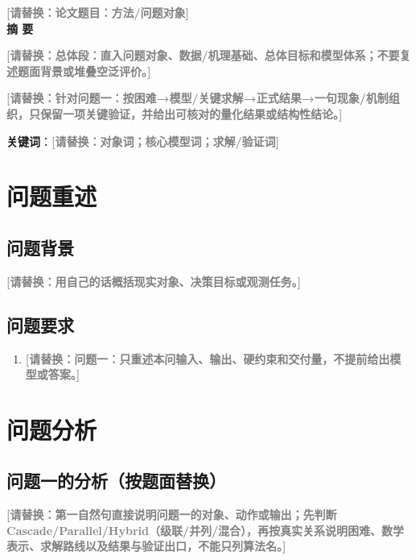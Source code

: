 \documentclass[12pt,a4paper]{ctexart}
\newcommand{\placeholder}[1]{\textcolor{gray}{\textbf{[请替换：#1]}}}
\begin{document}
\begin{center}
    {\heiti \textbf{\placeholder{论文题目：方法/问题对象}}}\\[1.5em]
    {\large \textbf{摘 \quad 要}}\\[1em]
\end{center}

\placeholder{总体段：直入问题对象、数据/机理基础、总体目标和模型体系；不要复述题面背景或堆叠空泛评价。}\par

\placeholder{针对问题一：按困难→模型/关键求解→正式结果→一句现象/机制组织，只保留一项关键验证，并给出可核对的量化结果或结构性结论。}\par

\vspace{1.5em}
\noindent \textbf{关键词}：\placeholder{对象词；核心模型词；求解/验证词}

\newpage

\section{问题重述}
\subsection{问题背景}
\placeholder{用自己的话概括现实对象、决策目标或观测任务。}

\subsection{问题要求}
\begin{enumerate}
    \item \placeholder{问题一：只重述本问输入、输出、硬约束和交付量，不提前给出模型或答案。}
\end{enumerate}

\section{问题分析}
\subsection{问题一的分析（按题面替换）}
\placeholder{第一自然句直接说明问题一的对象、动作或输出；先判断 Cascade/Parallel/Hybrid（级联/并列/混合），再按真实关系说明困难、数学表示、求解路线以及结果与验证出口，不能只列算法名。}
\end{document}
